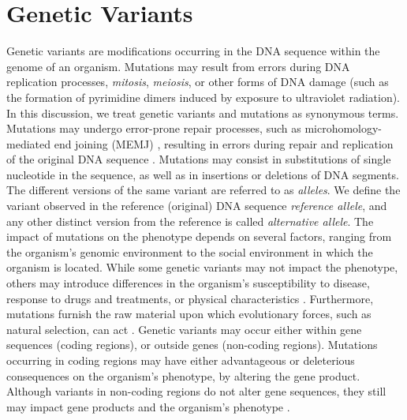 \documentclass[a4paper, titlepage, openright]{book}
\newcommand{\mychapter}[2]{
    \setcounter{chapter}{#1}
    \setcounter{section}{0}
    \chapter*{#2}
    \addcontentsline{toc}{chapter}{#2}
}
\begin{document}
%
\mychapter{2}{Genetic Variants}
Genetic variants are modifications occurring in the DNA sequence within the genome of an organism. Mutations may result from errors during DNA replication processes, \emph{mitosis}, \emph{meiosis}, or other forms of DNA damage (such as the formation of pyrimidine dimers induced by exposure to ultraviolet radiation). In this discussion, we treat genetic variants and mutations as synonymous terms. Mutations may undergo error-prone repair processes, such as microhomology-mediated end joining (MEMJ) \citep{sinha2017microhomology, seol2018microhomology}, resulting in errors during repair and replication of the original DNA sequence \citep{rodgers2016error}. Mutations may consist in substitutions of single nucleotide in the sequence, as well as in insertions or deletions of DNA segments. The different versions of the same variant are referred to as \emph{alleles}. We define the variant observed in the reference (original) DNA sequence \emph{reference allele}, and any other distinct version from the reference is called \emph{alternative allele}.
The impact of mutations on the phenotype depends on several factors, ranging from the organism's genomic environment to the social environment in which the organism is located. While some genetic variants may not impact the phenotype, others may introduce differences in the organism's susceptibility to disease, response to drugs and treatments, or physical characteristics \citep{bodmer2008common, ingelman2018integrating, mitchell2007evolutionary}. Furthermore, mutations furnish the raw material upon which evolutionary forces, such as natural selection, can act \citep{akey2004population, teotonio2009experimental}. Genetic variants may occur either within gene sequences (coding regions), or outside genes (non-coding regions).  Mutations occurring in coding regions may have either advantageous or deleterious consequences on the organism's phenotype, by altering the gene product. Although variants in non-coding regions do not alter gene sequences, they still may impact gene products and the organism's phenotype \citep{zhang2015non}. 

\end{document}
